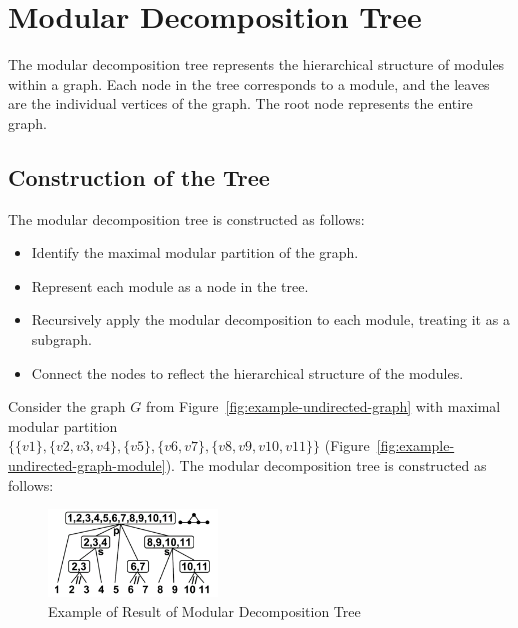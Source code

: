\section{Modular Decomposition Tree}\label{sec:modular-decomposition-tree}

The modular decomposition tree represents the hierarchical structure of modules within a graph.
Each node in the tree corresponds to a module, and the leaves are the individual vertices of the graph.
The root node represents the entire graph.

\subsection*{Construction of the Tree}\label{subsec:construction-of-the-tree}

The modular decomposition tree is constructed as follows:

\begin{itemize}
    \item Identify the maximal modular partition of the graph.
    \item Represent each module as a node in the tree.
    \item Recursively apply the modular decomposition to each module, treating it as a subgraph.
    \item Connect the nodes to reflect the hierarchical structure of the modules.
\end{itemize}


\begin{Example}
    Consider the graph $G$ from Figure~\ref{fig:example-undirected-graph} with maximal modular partition \\ $\{\{v1\}, \{v2, v3, v4\}, \{v5\}, \{v6, v7\}, \{v8, v9, v10, v11\}\}$ (Figure~\ref{fig:example-undirected-graph-module}).
    The modular decomposition tree is constructed as follows:

    \begin{figure}[!h]
        \centering
        \includegraphics[width=0.40\textwidth]{images/graphs/undirected_graph_wikipedia_modular_decomposition}
        \caption{Example of Result of Modular Decomposition Tree}
        \label{fig:example-undirected-graph-modular-decomposition-tree}
    \end{figure}
\end{Example}


